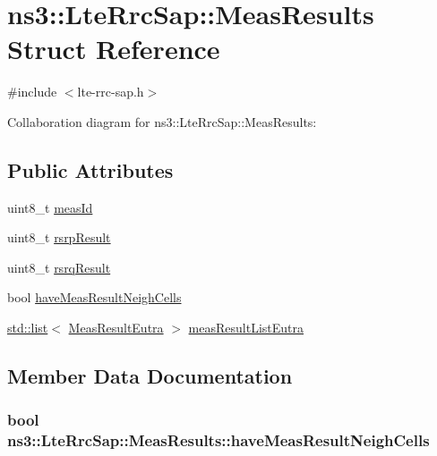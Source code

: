 \hypertarget{structns3_1_1LteRrcSap_1_1MeasResults}{}\section{ns3\+:\+:Lte\+Rrc\+Sap\+:\+:Meas\+Results Struct Reference}
\label{structns3_1_1LteRrcSap_1_1MeasResults}


{\ttfamily \#include $<$lte-\/rrc-\/sap.\+h$>$}



Collaboration diagram for ns3\+:\+:Lte\+Rrc\+Sap\+:\+:Meas\+Results\+:
\subsection*{Public Attributes}
\begin{DoxyCompactItemize}
\item 
uint8\+\_\+t \hyperlink{structns3_1_1LteRrcSap_1_1MeasResults_a1608bbea7e59da137c1b58d3bf55e907}{meas\+Id}
\item 
uint8\+\_\+t \hyperlink{structns3_1_1LteRrcSap_1_1MeasResults_a4d7bf8765525493fe5f5cccdbf94ab8b}{rsrp\+Result}
\item 
uint8\+\_\+t \hyperlink{structns3_1_1LteRrcSap_1_1MeasResults_a6a64246cfa5d09eb42120890de3dca32}{rsrq\+Result}
\item 
bool \hyperlink{structns3_1_1LteRrcSap_1_1MeasResults_a1a102ebfb647fe85739933dcd2532736}{have\+Meas\+Result\+Neigh\+Cells}
\item 
\hyperlink{openflow-interface_8h_afd9bcfa176617760671b67580f536fa7}{std\+::list}$<$ \hyperlink{structns3_1_1LteRrcSap_1_1MeasResultEutra}{Meas\+Result\+Eutra} $>$ \hyperlink{structns3_1_1LteRrcSap_1_1MeasResults_a1fc2cdef154508dd522b46c71f854f03}{meas\+Result\+List\+Eutra}
\end{DoxyCompactItemize}


\subsection{Member Data Documentation}
\subsubsection[{\texorpdfstring{have\+Meas\+Result\+Neigh\+Cells}{haveMeasResultNeighCells}}]{\setlength{\rightskip}{0pt plus 5cm}bool ns3\+::\+Lte\+Rrc\+Sap\+::\+Meas\+Results\+::have\+Meas\+Result\+Neigh\+Cells}\hypertarget{structns3_1_1LteRrcSap_1_1MeasResults_a1a102ebfb647fe85739933dcd2532736}{}\label{structns3_1_1LteRrcSap_1_1MeasResults_a1a102ebfb647fe85739933dcd2532736}
